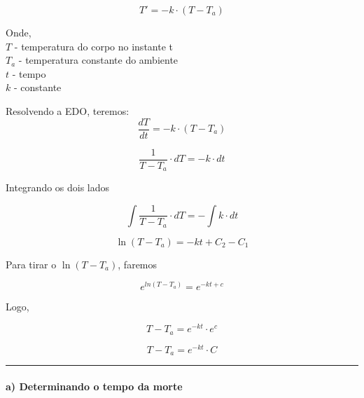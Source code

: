 \documentclass[11pt]{article}
\begin{document}
\begin{equation}
    \label{eq_newton}
    T' = -k \cdot (T - T_{a})
\end{equation}

Onde,\\
\(T\) - temperatura do corpo no instante t\\
\(T_{a}\) - temperatura constante do ambiente\\
\(t\) - tempo\\
\(k\) - constante

Resolvendo a EDO, teremos: \begin{equation*}
    \label{eq_newton_1}
    \frac{dT}{dt} = -k \cdot (T - T_{a})
\end{equation*}

\begin{equation*}
    \label{eq_newton_2}
    \frac{1}{T - T_{a}} \cdot dT = -k \cdot dt
\end{equation*}

Integrando os dois lados

\begin{equation*}
    \label{eq_newton_3}
    \int\frac{1}{T - T_{a}} \cdot dT = -\int k \cdot dt
\end{equation*}

\begin{equation*}
    \label{eq_newton_4}
    \ln(T - T_{a}) = - kt + C_{2} - C_{1}
\end{equation*}

Para tirar o \(\ln(T - T_{a})\), faremos

\begin{equation*}
    \label{eq_newton_5}
    e^{ln(T - T_{a})} = e^{-kt + c}
\end{equation*}

Logo,

\begin{equation*}
    T - T_{a} = e^{-kt} \cdot e^{c}
\end{equation*}

\begin{equation}
    \label{eq_newton_6}
    T - T_{a} = e^{-kt} \cdot C
\end{equation}

    \begin{center}\rule{0.5\linewidth}{\linethickness}\end{center}

\hypertarget{a-determinando-o-tempo-da-morte}{%
\paragraph{a) Determinando o tempo da
morte}\label{a-determinando-o-tempo-da-morte}}
\end{document}
